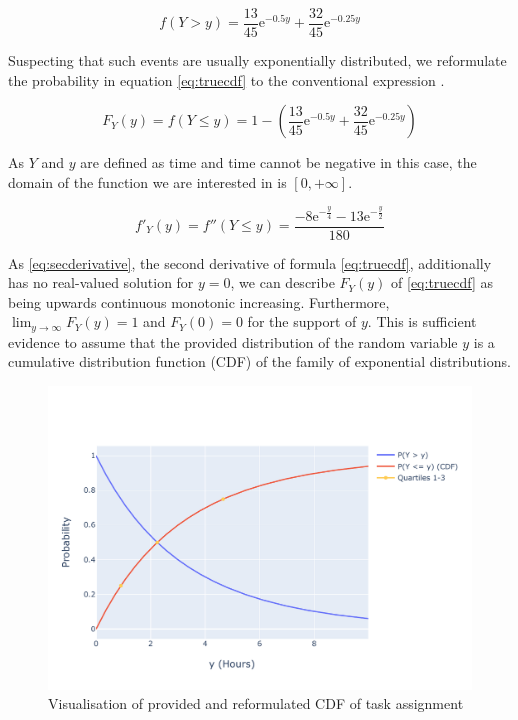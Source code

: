 \begin{equation}  f(Y > y) = \dfrac{13}{45}\mathrm{e}^{-0.5y} + \dfrac{32}{45}\mathrm{e}^{-0.25y}
\label{eq:initcdffractioned}
\end{equation}

Suspecting that such events are usually exponentially distributed, we reformulate the probability in equation \eqref{eq:truecdf} to the conventional expression \cite{deisenroth}. 

\begin{equation}  F_Y(y) = f(Y \leq y) =1-\left( \dfrac{13}{45}\mathrm{e}^{-0.5y} + \dfrac{32}{45}\mathrm{e}^{-0.25y} \right)
\label{eq:truecdf}
\end{equation}

As $Y$ and $y$ are defined as time and time cannot be negative in this case, the domain of the function we are interested in is $[0,+\infty]$.

\begin{equation} f'_Y(y) = f''(Y \leq y) = 
\dfrac{-8\mathrm{e}^{-\frac{y}{4}}-13\mathrm{e}^{-\frac{y}{2}}}{180}
\label{eq:secderivative}
\end{equation}

As \eqref{eq:secderivative}, the second derivative of formula \eqref{eq:truecdf},  additionally has no real-valued solution for $y=0$, we can describe $F_Y(y)$ of \eqref{eq:truecdf} as being upwards continuous monotonic increasing. Furthermore, $\lim_{y\to\infty} F_Y(y)= 1$ and $F_Y(0)= 0$ for the support of $y$. This is sufficient evidence to assume that the provided distribution of the random variable $y$ is a cumulative distribution function (CDF) of the family of exponential distributions. 

\begin{figure}[h]
\centering
\includegraphics[width=16cm]{pics/1c1.pdf}
\caption{Visualisation of provided and reformulated CDF of task assignment}
\label{fig:1c1}
\end{figure}
\FloatBarrier


